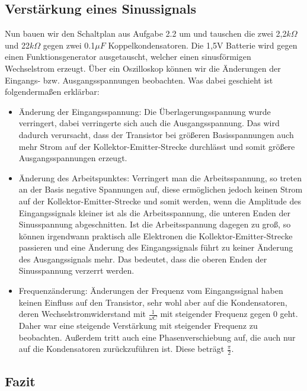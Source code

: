\subsection{Verstärkung eines Sinussignals}

Nun bauen wir den Schaltplan aus Aufgabe 2.2 um und tauschen die zwei 2,2\(k\Omega\) und 22\(k\Omega\) gegen zwei 0.1\(\mu F\) Koppelkondensatoren. Die 1,5V Batterie wird gegen einen Funktionsgenerator ausgetauscht, welcher einen sinusförmigen Wechselstrom erzeugt. Über ein Oszilloskop können wir die Änderungen der Eingangs- bzw. Ausgangsspannungen beobachten. Was dabei geschieht ist folgendermaßen erklärbar:

\begin{itemize}
\item Änderung der Eingangsspannung: Die Überlagerungsspannung wurde verringert, dabei verringerte sich auch die Ausgangsspannung. Das wird dadurch verursacht, dass der Transistor bei größeren Basisspannungen auch mehr Strom auf der Kollektor-Emitter-Strecke durchlässt und somit größere Ausgangsspannungen erzeugt.
\item Änderung des Arbeitspunktes: Verringert man die Arbeitsspannung, so treten an der Basis negative Spannungen auf, diese ermöglichen jedoch keinen Strom auf der Kollektor-Emitter-Strecke und somit werden, wenn die Amplitude des Eingangssignals kleiner ist als die Arbeitsspannung, die unteren Enden der Sinusspannung abgeschnitten. Ist die Arbeitsspannung dagegen zu groß, so können irgendwann praktisch alle Elektronen die Kollektor-Emitter-Strecke passieren und eine Änderung des Eingangssignals führt zu keiner Änderung des Ausgangssignals mehr. Das bedeutet, dass die oberen Enden der Sinusspannung verzerrt werden.
\item Frequenzänderung: Änderungen der Frequenz vom Eingangssignal haben keinen Einfluss auf den Transistor, sehr wohl aber auf die Kondensatoren, deren Wechselstromwiderstand mit \(\frac{1}{\omega C}\) mit steigender Frequenz gegen 0 geht. Daher war eine steigende Verstärkung mit steigender Frequenz zu beobachten. Außerdem tritt auch eine Phasenverschiebung auf, die auch nur auf die Kondensatoren zurückzuführen ist. Diese beträgt \(\frac{\pi}{2}\). 

\end{itemize}

\subsection{Fazit}

